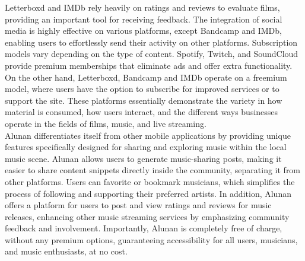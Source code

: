Letterboxd and IMDb rely heavily on ratings and reviews to evaluate films, providing an important tool for receiving feedback. The integration of social media is highly effective on various platforms, except Bandcamp and IMDb, enabling users to effortlessly send their activity on other platforms. Subscription models vary depending on the type of content. Spotify, Twitch, and SoundCloud provide premium memberships that eliminate ads and offer extra functionality. On the other hand, Letterboxd, Bandcamp and IMDb operate on a freemium model, where users have the option to subscribe for improved services or to support the site. These platforms essentially demonstrate the variety in how material is consumed, how users interact, and the different ways businesses operate in the fields of films, music, and live streaming. \\

Alunan differentiates itself from other mobile applications by providing unique features specifically designed for sharing and exploring music within the local music scene. Alunan allows users to generate music-sharing posts, making it easier to share content snippets directly inside the community, separating it from other platforms. Users can favorite or bookmark musicians, which simplifies the process of following and supporting their preferred artists. In addition, Alunan offers a platform for users to post and view ratings and reviews for music releases, enhancing other music streaming services by emphasizing community feedback and involvement. Importantly, Alunan is completely free of charge, without any premium options, guaranteeing accessibility for all users, musicians, and music enthusiasts, at no cost.